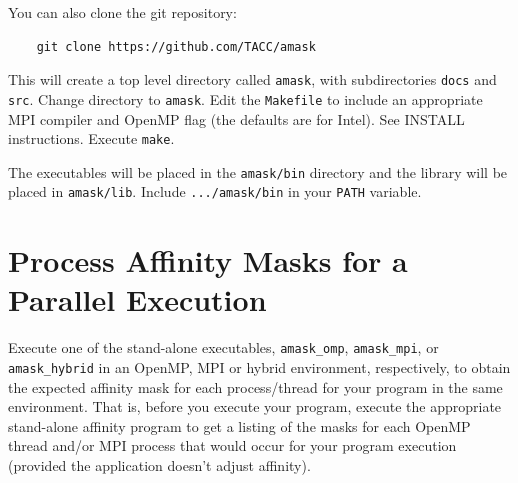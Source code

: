 \documentclass[10pt,a4paper]{report}
\begin{document}
You can also clone the git repository:

\begin{verbatim}
    git clone https://github.com/TACC/amask
\end{verbatim}

This will create a top level directory called \verb+amask+, with subdirectories 
\verb+docs+ and \verb+src+.  Change directory to  \verb+amask+. Edit the \verb+Makefile+ to include an appropriate
MPI compiler and OpenMP flag (the defaults are for Intel). See INSTALL instructions.  Execute \verb+make+.





The executables will be placed in the \verb+amask/bin+ directory and the library 
will be placed in \verb+amask/lib+. Include \verb+.../amask/bin+ in your \verb+PATH+ variable.

\FloatBarrier
\chapter{Process Affinity Masks for a Parallel Execution}


Execute one of the stand-alone executables, \verb+amask_omp+, \verb+amask_mpi+, or \\
\verb+amask_hybrid+ in an OpenMP, MPI or hybrid environment, 
respectively, to obtain the expected affinity mask for each 
process/thread for your program in the same environment.  That is,
before you execute your program, execute the appropriate stand-alone affinity
program to get a listing of the masks for each OpenMP thread and/or MPI process
that would occur for your program execution (provided the application doesn't adjust affinity).
\end{document}
